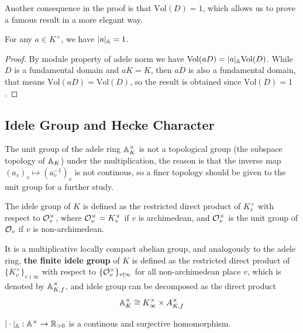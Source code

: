 Another consequence in the proof is that \(\mathrm{Vol}(D) = 1\), which allows us to prove a famous result in a more elegant way.

\begin{corollary} \label{product-formula}
    For any \(a \in K^\times\), we have \(|a|_{\mathbb{A}} = 1\).
\end{corollary}

\begin{proof}
    By module property of adele norm we have \(\mathrm{Vol}(aD )= |a|_{\mathbb{A}} \mathrm{Vol}(D)\). While \(D\) is a fundamental domain and \(aK = K\), then \(aD\) is also a fundamental domain, that means \(\mathrm{Vol}(aD) = \mathrm{Vol}(D)\), so the result is obtained since \(\mathrm{Vol}(D) = 1\).
\end{proof}

\subsection{Idele Group and Hecke Character}

The unit group of the adele ring \(\mathbb{A}_K^\times\) is not a topological group (the subspace topology of \(\mathbb{A}_K\)) under the multiplication, the reason is that the inverse map \((a_v)_v \mapsto (a_v^{-1})_v\) is not continous, so a finer topology should be given to the unit group for a further study.

\begin{definition}
    The idele group of \(K\) is defined as the restricted direct product of \(K_v^\times\) with respect to \(\mathcal{O}_v^\times\), where \(\mathcal{O}_v^\times = K_v^\times\) if \(v\) is archimedean, and \(\mathcal{O}_v^\times\) is the unit group of \(\mathcal{O}_v\) if \(v\) is non-archimedean.
\end{definition}

\begin{remark}
    It is a multiplicative locally compact abelian group, and analogously to the adele ring, \textbf{the finite idele group} of \(K\) is defined as the restricted direct product of \(\{K_v^\times\}_{v \nmid \infty}\) with respect to \(\{\mathcal{O}_v^\times\}_{v \nmid \infty}\) for all non-archimedean place \(v\), which is denoted by \(\mathbb{A}_{K,f}^\times\), and idele group can be decomposed as the direct product
    \[\mathbb{A}_K^\times \cong K_{\infty}^\times \times A^\times_{K,f}\]
\end{remark}


\begin{lemma} \label{continous-norm}
    \(|\cdot|_{\mathbb{A}}: \mathbb{A}^\times  \to \mathbb{R}_{>0}\) is a continous and surjective homomorphism.
\end{lemma}

